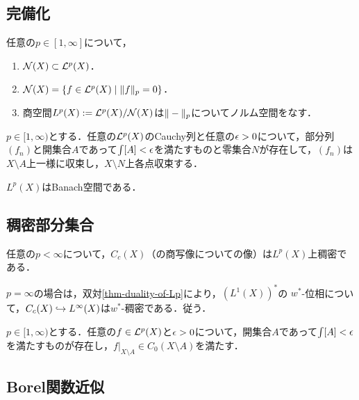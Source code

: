 \documentclass[uplatex,dvipdfmx]{jsreport}
\begin{document}
\subsection{完備化}

\begin{lemma}
    任意の$p\in[1,\infty]$について，
    \begin{enumerate}
        \item $\mathcal{N}(X)\subset\mathcal{L}^p(X)$．
        \item $\mathcal{N}(X)=\left\{f\in\mathcal{L}^p(X)\mid\|f\|_p=0\right\}$．
        \item 商空間$L^p(X):=\mathcal{L}^p(X)/\mathcal{N}(X)$は$\|-\|_p$についてノルム空間をなす．
    \end{enumerate}
\end{lemma}

\begin{proposition}
    $p\in[1,\infty)$とする．任意の$\mathcal{L}^p(X)$のCauchy列と任意の$\epsilon>0$について，部分列$(f_n)$と開集合$A$であって$\int[A]<\epsilon$を満たすものと零集合$N$が存在して，$(f_n)$は$X\setminus A$上一様に収束し，$X\setminus N$上各点収束する．
\end{proposition}

\begin{theorem}
    $L^p(X)$はBanach空間である．
\end{theorem}

\subsection{稠密部分集合}

\begin{proposition}
    任意の$p<\infty$について，$C_c(X)$（の商写像についての像）は$L^p(X)$上稠密である．
\end{proposition}
\begin{remarks}
    $p=\infty$の場合は，双対\ref{thm-duality-of-Lp}により，$(L^1(X))^*$の
    $w^*$-位相について，$C_c(X)\hookrightarrow L^\infty(X)$は$w^*$-稠密である．従う．
\end{remarks}

\begin{corollary}
    $p\in[1,\infty)$とする．任意の$f\in\mathcal{L}^p(X)$と$\epsilon>0$について，開集合$A$であって$\int[A]<\epsilon$を満たすものが存在し，$f|_{X\setminus A}\in C_0(X\setminus A)$を満たす．
\end{corollary}

\subsection{Borel関数近似}
\end{document}
